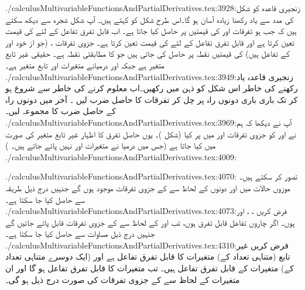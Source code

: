 ./calculusMultivariableFunctionsAndPartialDerivatives.tex:3928:زنجیری  قاعدہ کو شکل  کی  مدد سے یاد رکھنا زیادہ آسان  ہو گا۔اس طرح شکل  کو    کہتے ہیں۔  آپ شکل شجرہ سے  دیکھ سکتے ہیں کہ جب  ہو تفرقات  اور  کی قیمتیں    پر حاصل کیا جاتا ہے۔ اب  قابل تفرق تفاعل  کے لئے  کی قیمت  تعین کرتا ہے اور قابل تفرق تفاعل  کے لئے   کی قیمت  تعین کرتا ہے۔ جزوی تفرقات ،  (جو از خود  اور  کے تفاعل ہیں)  کی قیمتیں نقطہ  پر حاصل کی جاتی ہیں جو  کا مطابقتی نقطہ ہے۔ حقیقی  غیر تابع متغیر  ہے جبکہ  اور  درمیانے متغیرات اور   تابع متغیر ہے۔
./calculusMultivariableFunctionsAndPartialDerivatives.tex:3949:زنجیری قاعدہ یاد رکھنے کی خاطر اس شکل کو ذہن میں رکھیں۔اب   معلوم کرنے کی خاطر  سے شروع ہو کر  تک باری باری دونوں راہ پر  چل  کر  تفرقات کا  حاصل ضرب لیں ۔  آخر میں دونوں راہ کے حاصل ضرب کا  مجموعہ لیں۔ 
./calculusMultivariableFunctionsAndPartialDerivatives.tex:3969:آپ نے دیکھا کہ ہم نے  اور  کو جزوی تفرقات  اور  میں پر کیا (شکل )۔ یوں حاصل تفرق   کا اظہار غیر تابع متغیر  کی صورت میں   کیا جاتا ہے (جس میں  درمیا نے    متغیرات  اور  نہیں پائے  جاتے ہیں۔ )
./calculusMultivariableFunctionsAndPartialDerivatives.tex:4009:\caption{یہاں  سے  تک تین راستے ہیں۔اب بھی  حاصل کرنے کی خاطر ہر راہ پر چلتے ہوئے تفرقات کا ضرب لے کر تمام    کا مجموعہ لیں۔}
./calculusMultivariableFunctionsAndPartialDerivatives.tex:4070: تصور کر سکتے ہیں۔ موزوں حالات میں   اور  دونوں کے لحاظ سے  کے جزوی تفرقات موجود ہوں گے جنہیں درج ذیل طریقہ سے حاصل کیا جا سکتا ہے۔
./calculusMultivariableFunctionsAndPartialDerivatives.tex:4073:فرض کریں ، ،  اور  ہوں۔ اگر چاروں تفاعل قابل تفرق ہوں، تب  اور  کے لحاظ سے  کے جزوی تفرقات قابل  پائے جائیں گے جنہیں درج ذیل مساوات سے حاصل کیا جا سکتا ہے۔
./calculusMultivariableFunctionsAndPartialDerivatives.tex:4310:فرض کریں  غیر تابع (متناہی تعداد کے)  متغیرات   کا قابل تفرق تفاعل ہے اور   (ایک دوسرے متناہی تعداد کے)  متغیرات  کے قابل تفرق تفاعل ہیں۔ تب  متغیرات  کا قابل تفرق تفاعل ہو گا اور ان متغیرات کے لحاظ سے  کے جزوی تفرقات  کی  صورت درج ذیل ہو گی۔
